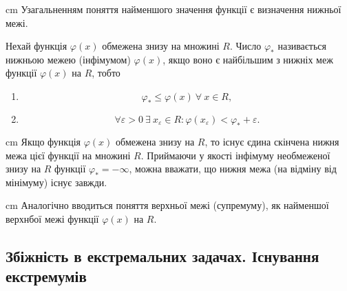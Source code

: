 \documentclass[12pt,a4paper]{article}
\begin{document}
\begin{figure}[h!]
\end{figure}
\begin{flushleft}
\parbox{14,5 cm}{ cm Узагальненням поняття найменшого значення функції є визначення нижньої межі.}
\end{flushleft}
\begin{law3}
Нехай функція $\varphi\left(x\right)$ обмежена знизу на множині $R$. Число ${\varphi}_*$ називається нижньою межею (інфімумом) $\varphi\left(x\right)$, якщо воно є найбільшим з нижніх меж функції $\varphi\left(x\right)$ на $R$, тобто
\begin{enumerate}
\item $${\varphi}_* \le \varphi \left(x\right) \ \forall \ x \in R,$$
\item $$\forall \varepsilon > 0\  \exists \ {x}_\varepsilon \in R: \varphi\left({x}_\varepsilon\right) < {\varphi}_* + \varepsilon.$$
\end{enumerate}
\end{law3}
\begin{flushleft}
\parbox{14,5 cm}{ cm Якщо функція $\varphi\left(x\right)$ обмежена знизу на $R$, то існує єдина скінчена нижня межа цієї функції на множині $R$. Приймаючи у якості інфімуму необмеженої знизу на $R$ функції ${\varphi}_* = -\infty$, можна вважати, що нижня межа (на відміну від мінімуму) існує завжди.}
\end{flushleft}
\begin{flushleft}
\parbox{14,5 cm}{ cm  Аналогічно вводиться поняття верхньої межі (супремуму), як найменшої верхнбої межі функції $\varphi\left(x\right)$ на $R$.}
\end{flushleft}
\begin{center}
		\subsection*{Збіжність в екстремальних задачах. Існування екстремумів}
	\end{center}
\end{document}

